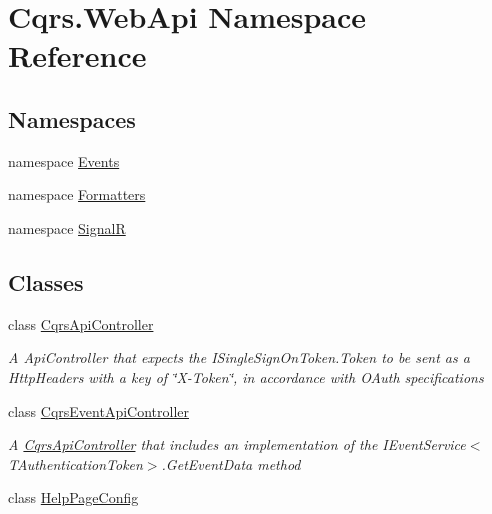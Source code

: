 \hypertarget{namespaceCqrs_1_1WebApi}{}\section{Cqrs.\+Web\+Api Namespace Reference}
\label{namespaceCqrs_1_1WebApi}
\subsection*{Namespaces}
\begin{DoxyCompactItemize}
\item 
namespace \hyperlink{namespaceCqrs_1_1WebApi_1_1Events}{Events}
\item 
namespace \hyperlink{namespaceCqrs_1_1WebApi_1_1Formatters}{Formatters}
\item 
namespace \hyperlink{namespaceCqrs_1_1WebApi_1_1SignalR}{SignalR}
\end{DoxyCompactItemize}
\subsection*{Classes}
\begin{DoxyCompactItemize}
\item 
class \hyperlink{classCqrs_1_1WebApi_1_1CqrsApiController}{Cqrs\+Api\+Controller}
\begin{DoxyCompactList}\small\item\em A Api\+Controller that expects the I\+Single\+Sign\+On\+Token.\+Token to be sent as a Http\+Headers with a key of \char`\"{}\+X-\/\+Token\char`\"{}, in accordance with O\+Auth specifications \end{DoxyCompactList}\item 
class \hyperlink{classCqrs_1_1WebApi_1_1CqrsEventApiController}{Cqrs\+Event\+Api\+Controller}
\begin{DoxyCompactList}\small\item\em A \hyperlink{classCqrs_1_1WebApi_1_1CqrsApiController}{Cqrs\+Api\+Controller} that includes an implementation of the I\+Event\+Service$<$\+T\+Authentication\+Token$>$.\+Get\+Event\+Data method \end{DoxyCompactList}\item 
class \hyperlink{classCqrs_1_1WebApi_1_1HelpPageConfig}{Help\+Page\+Config}
\end{DoxyCompactItemize}
